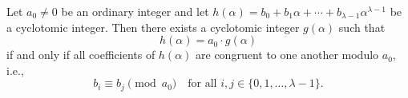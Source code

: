 Let $a_0 \neq 0$ be an ordinary integer and let $h(\alpha) = b_0 + b_1\alpha + \cdots + b_{\lambda-1}\alpha^{\lambda-1}$ be a cyclotomic integer. Then there exists a cyclotomic integer $g(\alpha)$ such that
$$h(\alpha) = a_0 \cdot g(\alpha)$$
if and only if all coefficients of $h(\alpha)$ are congruent to one another modulo $a_0$, i.e.,
$$b_i \equiv b_j \pmod{a_0} \quad \text{for all } i, j \in \{0, 1, \ldots, \lambda-1\}.$$
